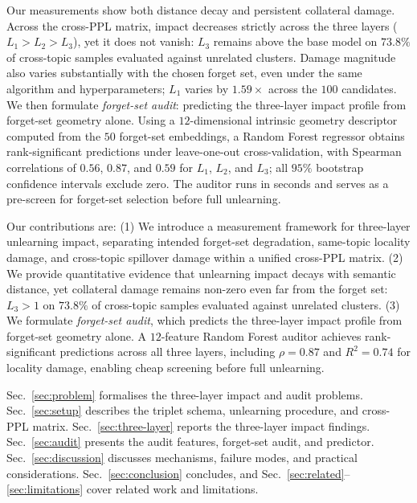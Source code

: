 \documentclass[11pt,a4paper]{article}
\newcommand{\Lone}{L_1}
\newcommand{\Ltwo}{L_2}
\newcommand{\Lthree}{L_3}
\begin{document}
Our measurements show both distance decay and persistent collateral damage.
Across the cross-PPL matrix, impact decreases strictly across the three layers
($\Lone{>}\Ltwo{>}\Lthree$), yet it does not vanish: $\Lthree$ remains above the
base model on $73.8\%$ of cross-topic samples evaluated against unrelated
clusters. Damage magnitude also varies substantially with the chosen forget
set, even under the same algorithm and hyperparameters; $\Lone$ varies by
$1.59\times$ across the $100$ candidates. We then formulate \emph{forget-set
audit}: predicting the three-layer impact profile from forget-set geometry
alone. Using a $12$-dimensional intrinsic geometry descriptor computed from the
$50$ forget-set embeddings, a Random Forest regressor obtains rank-significant
predictions under leave-one-out cross-validation, with Spearman correlations of
$0.56$, $0.87$, and $0.59$ for $\Lone$, $\Ltwo$, and $\Lthree$; all $95\%$
bootstrap confidence intervals exclude zero. The auditor runs in seconds and
serves as a pre-screen for forget-set selection before full unlearning.

Our contributions are:
(1) We introduce a measurement framework for three-layer unlearning impact,
separating intended forget-set degradation, same-topic locality damage, and
cross-topic spillover damage within a unified cross-PPL matrix.
(2) We provide quantitative evidence that unlearning impact decays with
semantic distance, yet collateral damage remains non-zero even far from the
forget set: $\Lthree > 1$ on $73.8\%$ of cross-topic samples evaluated against
unrelated clusters.
(3) We formulate \emph{forget-set audit}, which predicts the three-layer impact
profile from forget-set geometry alone. A $12$-feature Random Forest auditor
achieves rank-significant predictions across all three layers, including
$\rho = 0.87$ and $R^2 = 0.74$ for locality damage, enabling cheap screening
before full unlearning.

Sec.~\ref{sec:problem} formalises the three-layer impact and audit problems.
Sec.~\ref{sec:setup} describes the triplet schema, unlearning procedure, and
cross-PPL matrix. Sec.~\ref{sec:three-layer} reports the three-layer impact
findings. Sec.~\ref{sec:audit} presents the audit features, forget-set audit,
and predictor. Sec.~\ref{sec:discussion} discusses mechanisms, failure modes,
and practical considerations. Sec.~\ref{sec:conclusion} concludes, and
Sec.~\ref{sec:related}--\ref{sec:limitations} cover related work and
limitations.

\end{document}
